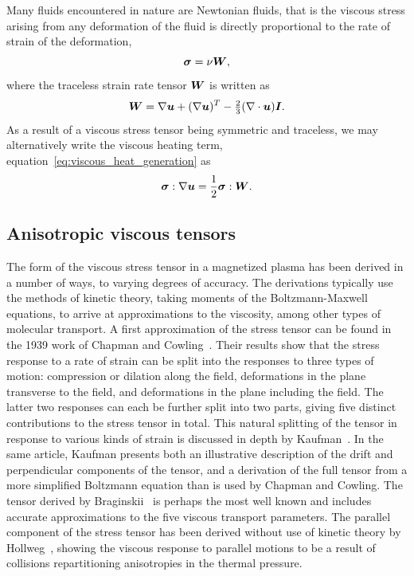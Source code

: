 Many fluids encountered in nature are Newtonian fluids, that is the viscous stress arising from any deformation of the fluid is directly proportional to the rate of strain of the deformation,
\begin{equation}
  \label{eq:isotropic_viscous_tensor}
  {\bm \sigma} = \nu {\bm W},
\end{equation}
where the traceless strain rate tensor ${\bm W}$ is written as
\begin{equation}
  \label{eq:rate_of_strain}
  {\bm W} = \nabla{\bm u} + (\nabla{\bm u})^T - \tfrac{2}{3}(\nabla \cdot {\bm u}){\bm I}.
\end{equation}
As a result of a viscous stress tensor being symmetric and traceless, we may alternatively write the viscous heating term, equation~\ref{eq:viscous_heat_generation} as
\begin{equation}
  \label{eq:viscous_heat_generation2}
  {\bm \sigma} : \nabla {\bm u} = \frac{1}{2} {\bm \sigma} : {\bm W}.
\end{equation}

\subsection{Anisotropic viscous tensors}

The form of the viscous stress tensor in a magnetized plasma has been derived in a number of ways, to varying degrees of accuracy. The derivations typically use the methods of kinetic theory, taking moments of the Boltzmann-Maxwell equations, to arrive at approximations to the viscosity, among other types of molecular transport. A first approximation of the stress tensor can be found in the 1939 work of Chapman and Cowling~\cite{chapmanMathematicalTheoryNonuniform1970}. Their results show that the stress response to a rate of strain can be split into the responses to three types of motion: compression or dilation along the field, deformations in the plane transverse to the field, and deformations in the plane including the field. The latter two responses can each be further split into two parts, giving five distinct contributions to the stress tensor in total. This natural splitting of the tensor in response to various kinds of strain is discussed in depth by Kaufman~\cite{kaufmanPlasmaViscosityMagnetic1960}. In the same article, Kaufman presents both an illustrative description of the drift and perpendicular components of the tensor, and a derivation of the full tensor from a more simplified Boltzmann equation than is used by Chapman and Cowling. The tensor derived by Braginskii~\cite{braginskiiTransportProcessesPlasma1965} is perhaps the most well known and includes accurate approximations to the five viscous transport parameters. The parallel component of the stress tensor has been derived without use of kinetic theory by Hollweg~\cite{hollwegViscosityMagnetizedPlasma1985}, showing the viscous response to parallel motions to be a result of collisions repartitioning anisotropies in the thermal pressure.

